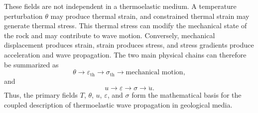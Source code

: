 These fields are not independent in a thermoelastic medium. A temperature perturbation \(\theta\) may produce thermal strain, and constrained thermal strain may generate thermal stress. This thermal stress can modify the mechanical state of the rock and may contribute to wave motion. Conversely, mechanical displacement produces strain, strain produces stress, and stress gradients produce acceleration and wave propagation. The two main physical chains can therefore be summarized as
\begin{equation}
\theta
\rightarrow
\varepsilon_{\mathrm{th}}
\rightarrow
\sigma_{\mathrm{th}}
\rightarrow
\text{mechanical motion},
\end{equation}
and
\begin{equation}
u
\rightarrow
\varepsilon
\rightarrow
\sigma
\rightarrow
\ddot{u}.
\end{equation}
Thus, the primary fields \(T\), \(\theta\), \(u\), \(\varepsilon\), and \(\sigma\) form the mathematical basis for the coupled description of thermoelastic wave propagation in geological media.